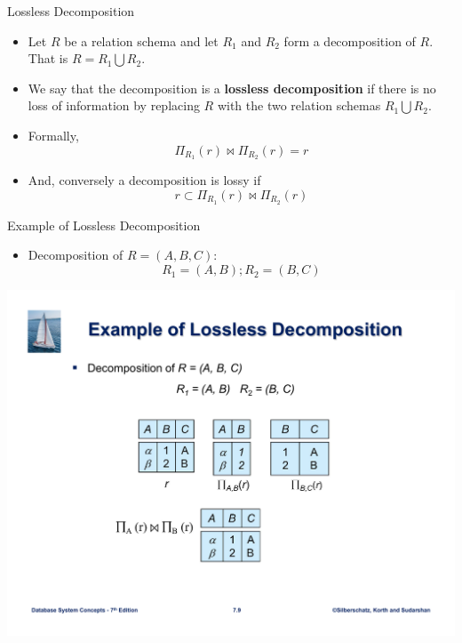 \documentclass{beamer}
\begin{document}
\begin{frame}{Lossless Decomposition}
    \begin{itemize}
        \item Let $R$ be a relation schema and let $R_1$ and $R_2$ form a decomposition of $R$. That is $R = R_1 \bigcup R_2$.
        \item We say that the decomposition is a \textbf{lossless decomposition} if there is no loss of information by replacing $R$ with the two relation schemas $R_1 \bigcup R_2$.
        \item Formally,
            $$
                \Pi_{R_1}(r) \Join \Pi_{R_2}(r) = r
            $$
        \item And, conversely a decomposition is lossy if
            $$
                r \subset \Pi_{R_1}(r) \Join \Pi_{R_2}(r)
            $$
    \end{itemize}
\end{frame}

\begin{frame}{Example of Lossless Decomposition}
    \begin{itemize}
        \item Decomposition of $R = (A, B, C)$:
            $$
                R_1 = (A, B); R_2 = (B, C)
            $$
    \end{itemize}
    \centering
    \includegraphics[width=\textwidth, trim={3cm 2cm 3cm 8cm}, clip]{figures/slide7_loss}
\end{frame}
\end{document}
